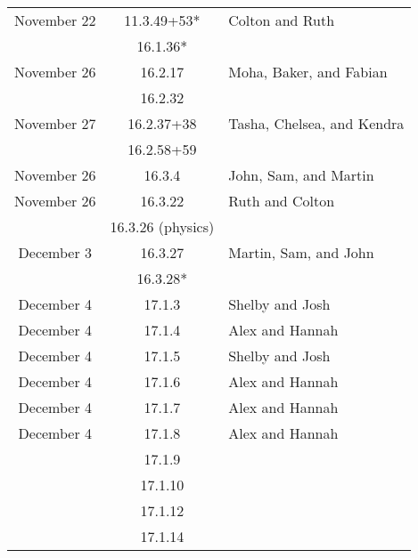 \documentclass[12pt]{amsart}
\begin{document}
\begin{longtable}{c|c|l}
        November 22     & 11.3.49+53*                          & Colton and Ruth                          \\
                        & 16.1.36*                             &                                          \\
        November 26     & 16.2.17                              & Moha, Baker, and Fabian                  \\
                        & 16.2.32                              &                                          \\
        November 27     & 16.2.37+38                           & Tasha, Chelsea, and Kendra               \\
                        & 16.2.58+59                           &                                          \\
        November 26     & 16.3.4                               & John, Sam, and Martin                    \\
        November 26     & 16.3.22                              & Ruth and Colton                          \\
                        & 16.3.26 (physics)                    &                                          \\
        December 3      & 16.3.27                              & Martin, Sam, and John                    \\
                        & 16.3.28*                             &                                          \\
        December 4      & 17.1.3                               & Shelby and Josh                          \\
        December 4      & 17.1.4                               & Alex and Hannah                          \\
        December 4      & 17.1.5                               & Shelby and Josh                          \\
        December 4      & 17.1.6                               & Alex and Hannah                          \\
        December 4      & 17.1.7                               & Alex and Hannah                          \\
        December 4      & 17.1.8                               & Alex and Hannah                          \\
                        & 17.1.9                               &                                          \\
                        & 17.1.10                              &                                          \\
                        & 17.1.12                              &                                          \\
                        & 17.1.14                              &                                          
    \end{longtable}
\end{document}
